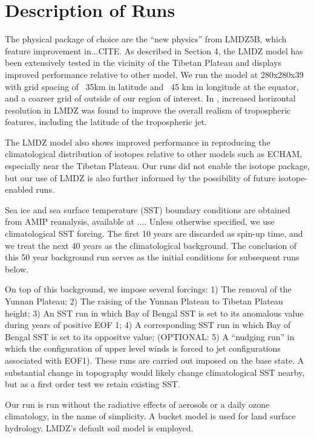 \section{Description of Runs}

The physical package of choice are the ``new physics'' from LMDZ5B, which feature improvement in...CITE. As described in Section 4, the LMDZ model has been extensively tested in the vicinity of the Tibetan Plateau and displays improved performance relative to other model. We run the model at 280x280x39 with grid spacing of ~35km in latitude and ~45 km in longitude at the equator, and a coarser grid of outside of our region of interest. In \cite{Hourdin2013}, increased horizontal resolution in LMDZ was found to improve the overall realism of tropospheric features, including the latitude of the tropospheric jet. 

The LMDZ model also shows improved performance in reproducing the climatological distribution of isotopes relative to other models such as ECHAM, especially near the Tibetan Plateau. Our runs did not enable the isotope package, but our use of LMDZ is also further informed by the possibility of future isotope-enabled runs.

Sea ice and sea surface temperature (SST) boundary conditions are obtained from AMIP reanalysis, available at .... Unless otherwise specified, we use climatological SST forcing. The first 10 years are discarded as spin-up time, and we treat the next 40 years as the climatological background. The conclusion of this 50 year background run serves as the initial conditions for subsequent runs below.

On top of this background, we impose several forcings: 1) The removal of the Yunnan Plateau; 2) The raising of the Yunnan Plateau to Tibetan Plateau height; 3) An SST run in which Bay of Bengal SST is set to its anomalous value during years of positive EOF 1; 4) A corresponding SST run in which Bay of Bengal SST is set to its oppositve value; (OPTIONAL: 5) A ``nudging run'' in which the configuration of upper level winds is forced to jet configurations associated with EOF1). These runs are carried out imposed on the base state. A substantial change in topography would likely change climatological SST nearby, but as a first order test we retain existing SST.

Our run is run without the radiative effects of aerosols or a daily ozone climatology, in the name of simplicity. A bucket model is used for land surface hydrology. LMDZ's default soil model is employed.


